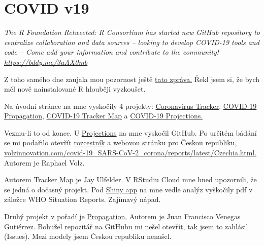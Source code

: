 \section{COVID v19}

\noindent
\footnotesize
\textit{The R Foundation Retweeted: R Consortium has started new GitHub repository to centralize collaboration and data sources -- looking to develop COVID-19 tools and code -- Come add your information and contribute to the community! \url{https://bddy.me/3aAX0mb}}\smallskip
\normalsize

\noindent
Z toho samého dne zaujala mou pozornost ještě \href{https://twitter.com/RConsortium/status/1253715512426663936}{tato zpráva.} Řekl jsem si, že bych měl nově nainstalované R hlouběji vyzkoušet.

Na úvodní stránce na mne vyskočily 4 projekty: 
    \href{https://github.com/RConsortium/r-collaboration/blob/master/projects/covid-19/covid-19-tracker.md}{Coronavirus Tracker,}
    \href{https://github.com/RConsortium/r-collaboration/blob/master/projects/covid-19/covid-19-propagation.md}{COVID-19 Propagation,} 
    \href{https://github.com/RConsortium/r-collaboration/blob/master/projects/covid-19/covid-19-tracker-map.md}{COVID-19 Tracker Map} a
    \href{https://github.com/volzinnovation/covid-19_SARS-CoV-2_corona}{COVID-19 Projections.}

Vezmu-li to od konce. U \href{https://github.com/volzinnovation/covid-19_SARS-CoV-2_corona}{Projections} na mne vyskočil GitHub. Po určitém bádání se mi podařilo otevřít \href{https://www.volzinnovation.com/covid-19_SARS-CoV-2_corona/}{rozcestník} a webovou stránku pro Českou republiku, \href{https://www.volzinnovation.com/covid-19_SARS-CoV-2_corona/reports/latest/Czechia.html}{\url{volzinnovation.com/covid-19_SARS-CoV-2_corona/reports/latest/Czechia.html}.} Autorem je Raphael Volz.

Autorem \href{https://github.com/RConsortium/r-collaboration/blob/master/projects/covid-19/covid-19-tracker-map.md}{Tracker Map} je Jay Ulfelder. V \href{https://rstudio.cloud/project/1013588}{RStudiu Cloud} mne hned upozornili, že se jedná o dočasný projekt. Pod \href{https://dartthrowingchimp.shinyapps.io/covid19-app/}{Shiny app} na mne vedle analýz vyškočily pdf v záložce WHO Situation Reports. Zajímavý nápad.

Druhý projekt v pořadí je \href{https://github.com/RConsortium/r-collaboration/blob/master/projects/covid-19/covid-19-propagation.md}{Propagation.} Autorem je Juan Francisco Venegas Gutiérrez. Bohužel repozitář na GitHubu mi nešel otevřít, tak jsem to zahlásil (Issues). Mezi modely jsem Českou republiku nenašel.

